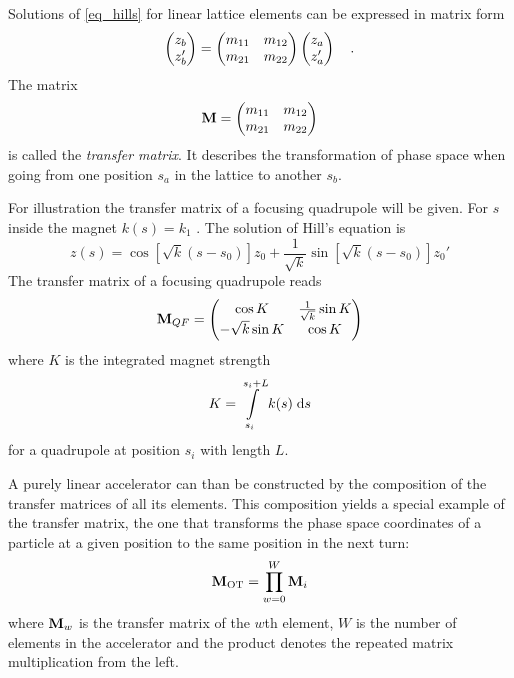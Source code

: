Solutions of \eqref{eq_hills} for linear lattice elements can be expressed in matrix form
%
\begin{equation}
    \begin{pmatrix}
        z_b\\
        z_b'
    \end{pmatrix}
    =
    \begin{pmatrix}
        m_{11} & m_{12} \\
        m_{21} & m_{22}
    \end{pmatrix}
    \begin{pmatrix}
        z_a\\
        z_a'
    \end{pmatrix}
    \quad .
    \label{eq_matrix_element}
\end{equation}
%
The matrix 
%
\begin{equation}
    \mathbf{M} = 
    \begin{pmatrix}
        m_{11} & m_{12} \\
        m_{21} & m_{22}
    \end{pmatrix}
    \label{eq_trmat}
\end{equation}
%
is called the \emph{transfer matrix}. It describes the transformation
of phase space when going from one position $s_a$ in the lattice to another $s_b$.

For illustration the transfer matrix of a focusing quadrupole will be given.
For $s$ inside the magnet $k(s) = k_1$ . The solution of Hill's equation is
%
\begin{equation}
    z(s) = \cos \left[ \sqrt{k}(s-s_0)\right] z_0 + \frac{1}{\sqrt{k}}\sin\left[\sqrt{k}(s-s_0)\right]z_0'
\end{equation}
%
The transfer matrix of a focusing quadrupole reads
%
\begin{equation}
    \mathbf{M}_{QF} =
    \begin{pmatrix}
        \cos K & \frac{1}{\sqrt{k}} \sin K \\
        -\sqrt{k}\sin K & \cos K
    \end{pmatrix}
\end{equation}
%
where $K$ is the integrated magnet strength
%
\begin{equation}
    K = \int\limits_{s_i}^{s_i + L} k(s)\;\text{d} s
\end{equation}
%
for a quadrupole at position $s_i$ with length $L$.

A purely linear accelerator can than be constructed by the composition of the transfer matrices of 
all its elements. This composition yields a special example of the transfer matrix, the one that
transforms the phase space coordinates of a particle at a given position to the same position in the
next turn:
%
\begin{equation}
    \mathbf{M}_\text{OT} = \prod\limits_{w=0}^W \mathbf{M}_i
\end{equation}
%
where $\mathbf{M}_w$ is the transfer matrix of the $w$th element, $W$ is the number of elements in the
accelerator and the product denotes the repeated matrix multiplication from the left.

